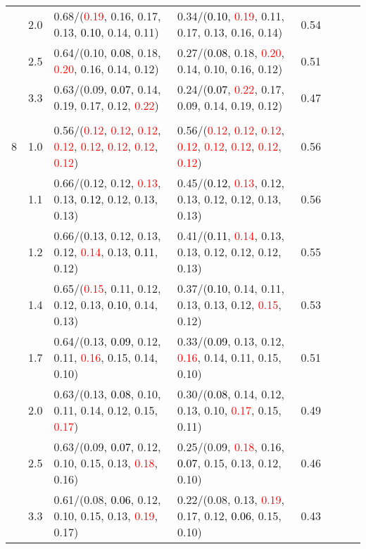 \documentclass[10pt,a4paper]{report}
\begin{document}
\begin{table}[!htbp]
\begin{center}
{\begin{tabular}{ccllcccc}
			&2.0&0.68/(\textcolor{red}{0.19}, 0.16, 0.17, 0.13, \textcolor{black}{0.10}, 0.14, 0.11)&0.34/(\textcolor{black}{0.10}, \textcolor{red}{0.19}, 0.11, 0.17, 0.13, 0.16, 0.14)&0.54\\
			&2.5&0.64/(0.10, \textcolor{black}{0.08}, 0.18, \textcolor{red}{0.20}, 0.16, 0.14, 0.12)&0.27/(\textcolor{black}{0.08}, 0.18, \textcolor{red}{0.20}, 0.14, 0.10, 0.16, 0.12)&0.51\\
			&3.3&0.63/(0.09, \textcolor{black}{0.07}, 0.14, 0.19, 0.17, 0.12, \textcolor{red}{0.22})&0.24/(\textcolor{black}{0.07}, \textcolor{red}{0.22}, 0.17, 0.09, 0.14, 0.19, 0.12)&0.47\\
			&&&&\\
			8			&1.0&0.56/(\textcolor{red}{0.12}, \textcolor{red}{0.12}, \textcolor{red}{0.12}, \textcolor{red}{0.12}, \textcolor{red}{0.12}, \textcolor{red}{0.12}, \textcolor{red}{0.12}, \textcolor{red}{0.12})&0.56/(\textcolor{red}{0.12}, \textcolor{red}{0.12}, \textcolor{red}{0.12}, \textcolor{red}{0.12}, \textcolor{red}{0.12}, \textcolor{red}{0.12}, \textcolor{red}{0.12}, \textcolor{red}{0.12})&0.56\\
			&1.1&0.66/(0.12, 0.12, \textcolor{red}{0.13}, 0.13, \textcolor{black}{0.12}, 0.12, 0.13, 0.13)&0.45/(\textcolor{black}{0.12}, \textcolor{red}{0.13}, 0.12, 0.13, 0.12, 0.12, 0.13, 0.13)&0.56\\
			&1.2&0.66/(0.13, 0.12, 0.13, 0.12, \textcolor{red}{0.14}, 0.13, \textcolor{black}{0.11}, 0.12)&0.41/(\textcolor{black}{0.11}, \textcolor{red}{0.14}, 0.13, 0.13, 0.12, 0.12, 0.12, 0.13)&0.55\\
			&1.4&0.65/(\textcolor{red}{0.15}, 0.11, 0.12, 0.12, 0.13, \textcolor{black}{0.10}, 0.14, 0.13)&0.37/(\textcolor{black}{0.10}, 0.14, 0.11, 0.13, 0.13, 0.12, \textcolor{red}{0.15}, 0.12)&0.53\\
			&1.7&0.64/(0.13, \textcolor{black}{0.09}, 0.12, 0.11, \textcolor{red}{0.16}, 0.15, 0.14, 0.10)&0.33/(\textcolor{black}{0.09}, 0.13, 0.12, \textcolor{red}{0.16}, 0.14, 0.11, 0.15, 0.10)&0.51\\
			&2.0&0.63/(0.13, \textcolor{black}{0.08}, 0.10, 0.11, 0.14, 0.12, 0.15, \textcolor{red}{0.17})&0.30/(\textcolor{black}{0.08}, 0.14, 0.12, 0.13, 0.10, \textcolor{red}{0.17}, 0.15, 0.11)&0.49\\
			&2.5&0.63/(0.09, \textcolor{black}{0.07}, 0.12, 0.10, 0.15, 0.13, \textcolor{red}{0.18}, 0.16)&0.25/(0.09, \textcolor{red}{0.18}, 0.16, \textcolor{black}{0.07}, 0.15, 0.13, 0.12, 0.10)&0.46\\
			&3.3&0.61/(0.08, \textcolor{black}{0.06}, 0.12, 0.10, 0.15, 0.13, \textcolor{red}{0.19}, 0.17)&0.22/(0.08, 0.13, \textcolor{red}{0.19}, 0.17, 0.12, \textcolor{black}{0.06}, 0.15, 0.10)&0.43\\
			\bottomrule
		\end{tabular}}
	\end{center}
\end{table}
\end{document}
